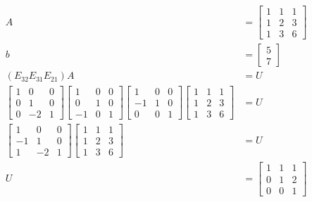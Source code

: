 \documentclass[main.tex]{subfiles}
\begin{document}
\begin{enumerate}
    $$
    \begin{aligned}
    A &= \left[\begin{array}{lll}
    1 & 1 & 1 \\
    1 & 2 & 3 \\
    1 & 3 & 6
    \end{array}\right] \\
    b &= \left[\begin{array}{l}
    5 \\
    7
    \end{array}\right]\\
    \left(E_{32} E_{31} E_{21}\right) A &= U\\
    \left[\begin{array}{ccc}
    1 & 0 & 0 \\
    0 & 1 & 0 \\
    0 & -2 & 1
    \end{array}\right]\left[\begin{array}{ccc}
    1 & 0 & 0 \\
    0 & 1 & 0 \\
    -1 & 0 & 1
    \end{array}\right]\left[\begin{array}{ccc}
    1 & 0 & 0 \\
    -1 & 1 & 0 \\
    0 & 0 & 1
    \end{array}\right]\left[\begin{array}{lll}
    1 & 1 & 1 \\
    1 & 2 & 3 \\
    1 & 3 & 6
    \end{array}\right] &= U\\
    \left[\begin{array}{ccc}
    1 & 0 & 0 \\
    -1 & 1 & 0 \\
    1 & -2 & 1
    \end{array}\right]\left[\begin{array}{lll}
    1 & 1 & 1 \\
    1 & 2 & 3 \\
    1 & 3 & 6
    \end{array}\right] &= U\\
    U &= \left[\begin{array}{lll}
    1 & 1 & 1 \\
    0 & 1 & 2 \\
    0 & 0 & 1
    \end{array}\right]\\

\end{aligned}$$
\end{enumerate}
\end{document}
